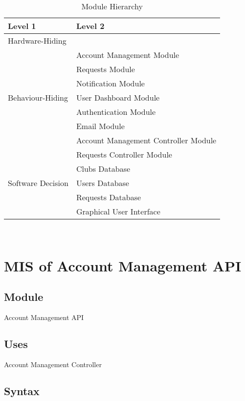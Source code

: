 \documentclass[12pt, titlepage]{article}
\begin{document}
\begin{table}[h!]
\centering
\begin{tabular}{p{} p{}}
\toprule
\textbf{Level 1} & \textbf{Level 2}\\
\midrule

{Hardware-Hiding} & ~ \\
\midrule

\multirow{7}{0.3\textwidth}{Behaviour-Hiding} 
& Account Management Module\\
& Requests Module\\
& Notification Module\\
& User Dashboard Module\\
& Authentication Module\\ 
& Email Module\\
& Account Management Controller Module\\
& Requests Controller Module\\
\midrule

\multirow{3}{0.3\textwidth}{Software Decision} 
& Clubs Database\\
& Users Database\\
& Requests Database\\
& Graphical User Interface\\
\bottomrule

\end{tabular}
\caption{Module Hierarchy}
\label{TblMH}
\end{table}

\newpage
~\newpage

\section{MIS of Account Management API} \label{AccountManagementAPI}

\subsection{Module}
Account Management API

\subsection{Uses}
Account Management Controller

\subsection{Syntax}
\end{document}
